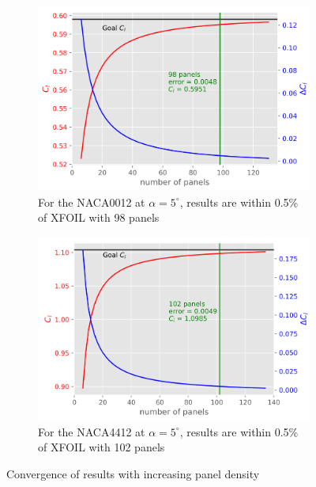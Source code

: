 \begin{figure}[h]
  \centering
  \begin{subfigure}{.5\textwidth}
    \centering
    \captionsetup{width=.8\linewidth}
    \includegraphics[width=.9\linewidth]{static/conv_thick_sym.png}
    \caption{For the NACA0012 at $\alpha = 5^{\circ}$, results are within 0.5\% of XFOIL with 98 panels}
    \label{fig:thick_panels1}
  \end{subfigure}%
  \begin{subfigure}{.5\textwidth}
    \centering
    \captionsetup{width=.8\linewidth}
    \includegraphics[width=.9\linewidth]{static/conv_thick.png}
    \caption{For the NACA4412 at $\alpha = 5^{\circ}$, results are within 0.5\% of XFOIL with 102 panels}
    \label{fig:thick_panels2}
  \end{subfigure}
  \caption{\centering Convergence of results with increasing panel density}
  \label{fig:thick_panels}
\end{figure}
